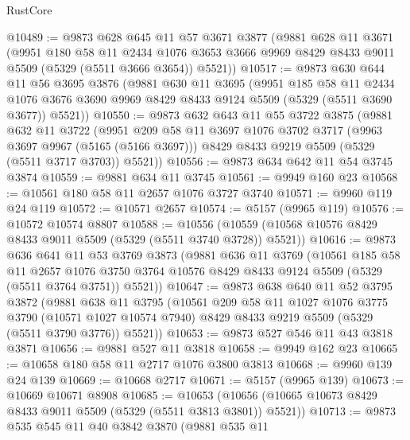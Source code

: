 \begin{lexlean}{RustCore}
\begin{coremodule}
@10489 := @9873
    @628
    @645
    @11
    @57
    @3671
    @3877
    (@9881
      @628
      @11
      @3671
      (@9951
        @180
        @58
        @11
        @2434
        @1076
        @3653
        @3666
        @9969
        @8429
        @8433
        @9011
        @5509
        (@5329 (@5511 @3666 @3654))
        @5521))
@10517 := @9873
    @630
    @644
    @11
    @56
    @3695
    @3876
    (@9881
      @630
      @11
      @3695
      (@9951
        @185
        @58
        @11
        @2434
        @1076
        @3676
        @3690
        @9969
        @8429
        @8433
        @9124
        @5509
        (@5329 (@5511 @3690 @3677))
        @5521))
@10550 := @9873
    @632
    @643
    @11
    @55
    @3722
    @3875
    (@9881
      @632
      @11
      @3722
      (@9951
        @209
        @58
        @11
        @3697
        @1076
        @3702
        @3717
        (@9963 @3697 @9967 (@5165 (@5166 @3697)))
        @8429
        @8433
        @9219
        @5509
        (@5329 (@5511 @3717 @3703))
        @5521))
@10556 := @9873 @634 @642 @11 @54 @3745 @3874
@10559 := @9881 @634 @11 @3745
@10561 := @9949 @160 @23
@10568 := @10561 @180 @58 @11 @2657 @1076 @3727 @3740
@10571 := @9960 @119 @24 @119
@10572 := @10571 @2657
@10574 := @5157 (@9965 @119)
@10576 := @10572 @10574 @8807
@10588 := @10556 (@10559 (@10568 @10576 @8429 @8433 @9011 @5509 (@5329 (@5511 @3740 @3728)) @5521))
@10616 := @9873
    @636
    @641
    @11
    @53
    @3769
    @3873
    (@9881
      @636
      @11
      @3769
      (@10561
        @185
        @58
        @11
        @2657
        @1076
        @3750
        @3764
        @10576
        @8429
        @8433
        @9124
        @5509
        (@5329 (@5511 @3764 @3751))
        @5521))
@10647 := @9873
    @638
    @640
    @11
    @52
    @3795
    @3872
    (@9881
      @638
      @11
      @3795
      (@10561
        @209
        @58
        @11
        @1027
        @1076
        @3775
        @3790
        (@10571 @1027 @10574 @7940)
        @8429
        @8433
        @9219
        @5509
        (@5329 (@5511 @3790 @3776))
        @5521))
@10653 := @9873 @527 @546 @11 @43 @3818 @3871
@10656 := @9881 @527 @11 @3818
@10658 := @9949 @162 @23
@10665 := @10658 @180 @58 @11 @2717 @1076 @3800 @3813
@10668 := @9960 @139 @24 @139
@10669 := @10668 @2717
@10671 := @5157 (@9965 @139)
@10673 := @10669 @10671 @8908
@10685 := @10653 (@10656 (@10665 @10673 @8429 @8433 @9011 @5509 (@5329 (@5511 @3813 @3801)) @5521))
@10713 := @9873
    @535
    @545
    @11
    @40
    @3842
    @3870
    (@9881
      @535
      @11

\end{coremodule}
\end{lexlean}
